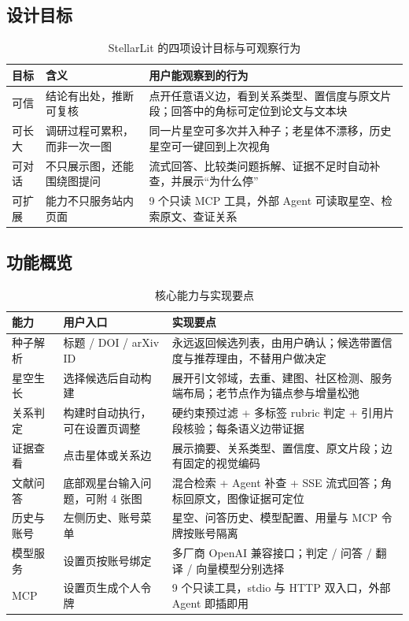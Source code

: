 \subsection{设计目标}

\begin{table}[H]
  \centering
  \footnotesize
  \caption{StellarLit 的四项设计目标与可观察行为}
  \label{tab:goals}
  \begin{tabularx}{\textwidth}{L{2.6cm}L{5.6cm}Y}
    \toprule
\textbf{目标} & \textbf{含义} & \textbf{用户能观察到的行为} \\
    \midrule
    可信 & 结论有出处，推断可复核 & 点开任意语义边，看到关系类型、置信度与原文片段；回答中的角标可定位到论文与文本块 \\
    可长大 & 调研过程可累积，而非一次一图 & 同一片星空可多次并入种子；老星体不漂移，历史星空可一键回到上次视角 \\
    可对话 & 不只展示图，还能围绕图提问 & 流式回答、比较类问题拆解、证据不足时自动补查，并展示“为什么停” \\
    可扩展 & 能力不只服务站内页面 & 9 个只读 MCP 工具，外部 Agent 可读取星空、检索原文、查证关系 \\
    \bottomrule
  \end{tabularx}
\end{table}

\subsection{功能概览}

\begin{table}[H]
  \centering
  \caption{核心能力与实现要点}
  \label{tab:features}
  \begin{tabularx}{\textwidth}{L{3.1cm}L{4.6cm}Y}
    \toprule
\textbf{能力} & \textbf{用户入口} & \textbf{实现要点} \\
    \midrule
    种子解析 & 标题 / DOI / arXiv ID & 永远返回候选列表，由用户确认；候选带置信度与推荐理由，不替用户做决定 \\
    星空生长 & 选择候选后自动构建 & 展开引文邻域，去重、建图、社区检测、服务端布局；老节点作为锚点参与增量松弛 \\
    关系判定 & 构建时自动执行，可在设置页调整 & 硬约束预过滤 + 多标签 rubric 判定 + 引用片段核验；每条语义边带证据 \\
    证据查看 & 点击星体或关系边 & 展示摘要、关系类型、置信度、原文片段；边有固定的视觉编码 \\
    文献问答 & 底部观星台输入问题，可附 4 张图 & 混合检索 + Agent 补查 + SSE 流式回答；角标回原文，图像证据可定位 \\
    历史与账号 & 左侧历史、账号菜单 & 星空、问答历史、模型配置、用量与 MCP 令牌按账号隔离 \\
    模型服务 & 设置页按账号绑定 & 多厂商 OpenAI 兼容接口；判定 / 问答 / 翻译 / 向量模型分别选择 \\
    MCP & 设置页生成个人令牌 & 9 个只读工具，stdio 与 HTTP 双入口，外部 Agent 即插即用 \\
    \bottomrule
  \end{tabularx}
\end{table}

